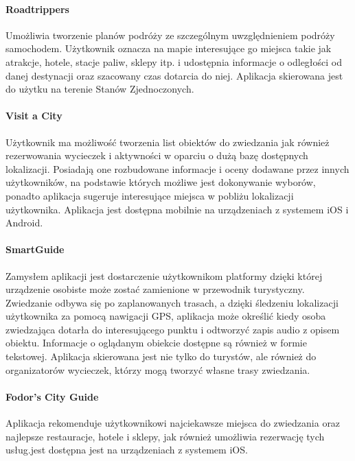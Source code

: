\paragraph{Roadtrippers}

Umożliwia tworzenie planów podróży ze szczególnym uwzględnieniem podróży samochodem.
Użytkownik oznacza na mapie interesujące go miejsca takie jak atrakcje, hotele, stacje paliw, sklepy itp.
i udostępnia informacje o odległości od danej destynacji oraz szacowany czas dotarcia do niej.
Aplikacja skierowana jest do użytku na terenie Stanów Zjednoczonych.

\paragraph{Visit a City}

Użytkownik ma możliwość tworzenia list obiektów do zwiedzania jak również rezerwowania wycieczek i aktywności w oparciu o dużą bazę dostępnych lokalizacji.
Posiadają one rozbudowane informacje i oceny dodawane przez innych użytkowników, na podstawie których możliwe jest dokonywanie wyborów, ponadto aplikacja
sugeruje interesujące miejsca w pobliżu lokalizacji użytkownika. Aplikacja jest dostępna mobilnie na urządzeniach z systemem iOS i Android.

\paragraph{SmartGuide}

Zamysłem aplikacji jest dostarczenie użytkownikom platformy dzięki której urządzenie osobiste może zostać zamienione w przewodnik turystyczny.
Zwiedzanie odbywa się po zaplanowanych trasach, a dzięki śledzeniu lokalizacji użytkownika za pomocą nawigacji GPS, aplikacja może określić kiedy
osoba zwiedzająca dotarła do interesującego punktu i odtworzyć zapis audio z opisem obiektu. Informacje o oglądanym obiekcie dostępne są również
w formie tekstowej. Aplikacja skierowana jest nie tylko do turystów, ale również do organizatorów wycieczek, którzy mogą tworzyć własne trasy zwiedzania.

\paragraph{Fodor's City Guide}

Aplikacja rekomenduje użytkownikowi najciekawsze miejsca do zwiedzania oraz najlepsze restauracje, hotele i sklepy, jak również umożliwia rezerwację
tych usług.jest dostępna jest na urządzeniach z systemem iOS.

